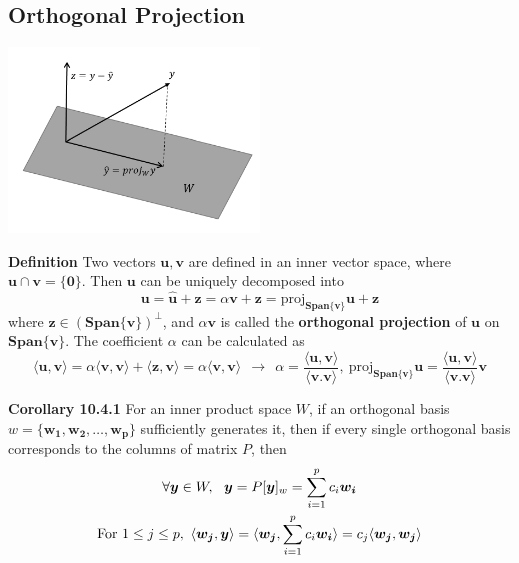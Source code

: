 \documentclass[11pt]{article}
\begin{document}
\subsection{Orthogonal Projection}
\begin{center} {\includegraphics[width = 0.5\textwidth]{Auxiliary Files/Perp Proj.png} }\end{center}
\textbf{Definition} Two vectors $\bm{u}, \bm{v}$ are defined in an inner vector space, where $\bm{u} \cap \bm{v} = \{\bm{0}\}$. Then $\bm{u}$ can be uniquely decomposed into
\begin{equation}
    \bm{u} = \hat{\bm{u}} + \bm{z} = \alpha \bm{v} +  \bm{z} =  \text{proj}_{\bm{Span}\{\bm{v}\}}\bm{u} + \bm{z}
\end{equation}
where $\bm{z} \in (\bm{Span}\{\bm{v}\})^{\perp}$, and $\alpha \bm{v}$ is called the \textbf{orthogonal projection} of $\bm{u}$ on $\bm{Span}\{\bm{v}\}$. The coefficient $\alpha$ can be calculated as
\begin{equation}
    \langle \bm{u},\bm{v}\rangle = \alpha \langle \bm{v},\bm{v}\rangle + \langle \bm{z} , \bm{v} \rangle = \alpha \langle \bm{v},\bm{v}\rangle~~\rightarrow~~\alpha = \frac{\langle \bm{u},\bm{v} \rangle}{\langle \bm{v}.\bm{v}\rangle },~\text{proj}_{\bm{Span}\{\bm{v}\}}\bm{u} = \frac{\langle \bm{u},\bm{v} \rangle}{\langle \bm{v}.\bm{v}\rangle } \bm{v}
\end{equation}\par \noindent 
\textbf{Corollary 10.4.1} For an inner product space $W$, if an orthogonal basis $w = \{\bm{w_1},\bm{w_2},\dots, \bm{w_p} \}$ sufficiently generates it, then if every single orthogonal basis corresponds to the columns of matrix $P$, then
\begin{gather}
    \forall \bm{y} \in W,~~\bm{y} = P[\bm{y}]_{w} = \sum_{i=1}^{p}c_i \bm{w_i} \notag\\
    \text{For}~1 \leq j \leq p,~\langle \bm{w_j}, \bm{y} \rangle = \langle \bm{w_j}, \sum_{i=1}^p c_i \bm{w_i} \rangle = c_j \langle \bm{w_j}, \bm{w_j} \rangle 
\end{gather}
\end{document}
